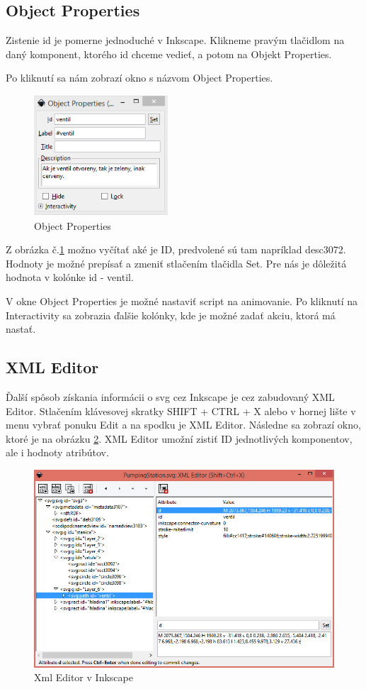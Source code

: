 \subsection{Object Properties}
Zistenie id je pomerne jednoduché v Inkscape. Klikneme pravým tlačidlom na daný komponent, ktorého id chceme vedieť, a potom na Objekt Properties.

Po kliknutí sa nám zobrazí okno s názvom Object Properties. 

\begin{figure}[H]
	\begin{center}
		\includegraphics [width=5cm]  {obrazky/obr3.png}
		\caption{Object Properties}
		\label{picture3}
	\end{center}
\end{figure}


Z obrázka č.\ref{picture3} možno vyčítať aké je ID, predvolené sú tam napríklad desc3072. Hodnoty je možné prepísať a zmeniť stlačením tlačidla Set. Pre nás je dôležitá hodnota v kolónke id - ventil. 

V okne Object Properties je možné nastaviť script na animovanie. Po kliknutí na Interactivity sa zobrazia ďalšie kolónky, kde je možné zadať akciu, ktorá má nastať.  


\subsection{XML Editor}
Ďalší spôsob získania informácii o svg cez Inkscape je cez zabudovaný XML Editor.
Stlačením klávesovej skratky SHIFT + CTRL + X alebo v hornej lište v menu vybrať ponuku Edit a na spodku je XML Editor. Následne sa zobrazí okno, ktoré je na obrázku \ref{xmlEditor}. XML Editor umožní zistiť ID jednotlivých komponentov, ale i hodnoty atribútov. 

\begin{figure}[H]
	\begin{center}
		\includegraphics[width=0.6\linewidth]  {obrazky/XmlEditor2.png}
		\caption{Xml Editor v Inkscape}
		\label{xmlEditor}
	\end{center}
\end{figure}



